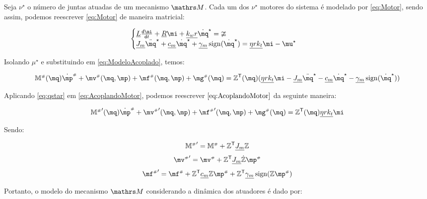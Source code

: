\documentclass[a4paper,11pt,brazil,fleqn]{article}
\begin{document}
Seja $\nu^\star$ o n\'umero de juntas atuadas de um mecanismo $\ssM$. Cada um dos $\nu^\star$ motores do sistema \'e modelado por \eqref{eq:Motor}, sendo assim, podemos reescrever \eqref{eq:Motor} de maneira matricial:

\begin{equation} \label{eq:MotorMatriz}
\begin{cases}
\underline{L} \frac{\dd \mi}{\dd t} + \underline{R} \mi + \underline{k_w r} \dot{\mq}^\star = \mup  \\
\underline{J_m} \ddot{\mq}^\star + \underline{c_m} \dot{\mq}^\star + \underline{\gamma_m} \sign(\dot{\mq}^\star) = \underline{\eta r k_t} \mi - \mu^\star
\end{cases}
\end{equation}

Isolando $\mu^\star$ e substituindo em \eqref{eq:ModeloAcoplado}, temos:

\begin{equation} \label{eq:AcoplandoMotor}
\mM\ssh(\mq) \dot{\mp}\ssh + \mv\ssh(\mq,\mp) + \mf\ssh(\mq,\mp) + \mg\ssh(\mq) = \mZ^\msT (\mq) (\underline{\eta r k_t} \mi - \underline{J_m} \ddot{\mq}^\star - \underline{c_m} \dot{\mq}^\star - \underline{\gamma_m} \sign(\dot{\mq}^\star) )
\end{equation}

Aplicando \eqref{eq:qstar} em \eqref{eq:AcoplandoMotor}, podemos reescrever $\eqref{eq:AcoplandoMotor}$ da seguinte maneira:

\begin{equation}
{\mM\ssh}'(\mq) \dot{\mp}\ssh + {\mv\ssh}'(\mq,\mp) + {\mf\ssh}'(\mq,\mp) + {\mg\ssh}(\mq) = \mZ^\msT (\mq) \underline{\eta r k_t} \mi
\end{equation}

Sendo:

\begin{equation}
{\mathbb{M}^{\scriptscriptstyle \#}}' = \mathbb{M}^{\scriptscriptstyle \#} + \mathbb{Z}^{\mathsf{T}} \underline{J_m} \mathbb{Z}
\end{equation}
\begin{equation}
{\mv\ssh}' = \mv\ssh + \mZ^\msT \underline{J_m} \dot{\mZ}\mp\ssh
\end{equation}
\begin{equation}
{\mf\ssh}' = \mf\ssh + \mZ^\msT \underline{c_m} \mZ \mp\ssh + \mZ^\msT \underline{\gamma_m} \sign(\mZ \mp\ssh)
\end{equation}

Portanto, o modelo do mecanismo $\ssM$ considerando a din\^amica dos atuadores \'e dado por:
\end{document}
